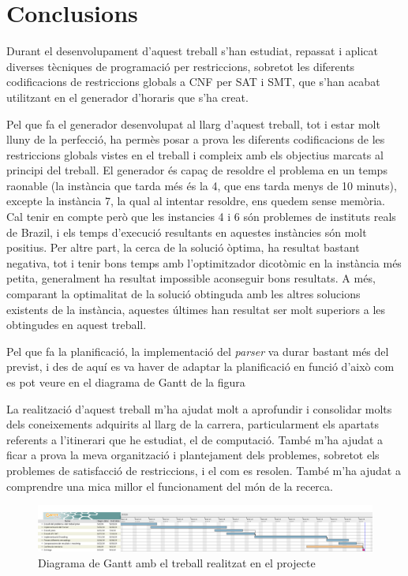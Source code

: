 \documentclass[11pt,a4paper,twoside]{report}
\begin{document}
  \chapter{Conclusions}

  Durant el desenvolupament d'aquest treball s'han estudiat, repassat i aplicat diverses tècniques de programació per restriccions, 
  sobretot les diferents codificacions de restriccions globals a CNF per SAT i SMT, que s'han acabat utilitzant en el generador d'horaris que s'ha creat. 

  Pel que fa el generador desenvolupat al llarg d'aquest treball, tot i estar molt lluny de la perfecció, 
  ha permès posar a prova les diferents codificacions de les restriccions globals vistes en el treball 
  i compleix amb els objectius marcats al principi del treball. El generador és capaç de resoldre el problema en un temps raonable (la instància que tarda més és la 4, que ens tarda menys de 10 minuts), 
  excepte la instància 7, la qual al intentar resoldre, ens quedem sense memòria. Cal tenir en compte però que les instancies 4 i 6 són problemes de instituts reals de Brazil, i els temps d'execució resultants en aquestes instàncies són molt positius.
  Per altre part, la cerca de la solució òptima, ha resultat bastant negativa, tot i tenir bons temps amb l'optimitzador dicotòmic en la instància més petita, generalment ha resultat impossible aconseguir bons resultats. 
  A més, comparant la optimalitat de la solució obtinguda amb les altres solucions existents de la instància, aquestes últimes han resultat ser molt superiors a les obtingudes en aquest treball.


  Pel que fa la planificació, la implementació del \textit{parser} va durar bastant més del previst, i des de aquí es va haver de adaptar la planificació en funció d'això com es pot veure en el diagrama de Gantt de la figura \label{fig:Gantt2}

  La realització d'aquest treball m'ha ajudat molt a aprofundir i consolidar molts dels coneixements adquirits al llarg de la carrera, particularment els apartats referents a l'itinerari que he estudiat, el de computació. 
  També m'ha ajudat a ficar a prova la meva organització i plantejament dels problemes, sobretot els problemes de satisfacció de restriccions, i el com es resolen. 
  També m'ha ajudat a comprendre una mica millor el funcionament del món de la recerca. 


  \begin{figure}
    \centering
    \includegraphics[angle=90,origin=c,height=0.58\textheight]{Diagrames/gantt2.png} 
    \caption{Diagrama de Gantt amb el treball realitzat en el projecte}
    \label{fig:Gantt2}
  \end{figure}
 
\end{document}
